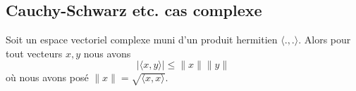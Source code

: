 \subsection{Cauchy-Schwarz etc. cas complexe}

\begin{theorem}      \label{THOooSUCBooFnpkaF}
     Soit un espace vectoriel complexe muni d'un produit hermitien \( \langle ., .\rangle \). Alors pour tout vecteurs \( x,y\) nous avons
     \begin{equation}
         | \langle x, y\rangle  |\leq \| x \|\| y \|
     \end{equation}
     où nous avons posé \( \| x \|=\sqrt{ \langle x, x\rangle  }\).
\end{theorem}

